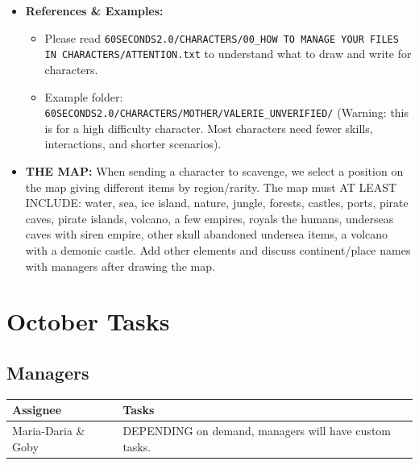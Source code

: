 \documentclass[11pt,a4paper]{article}
\begin{document}
\begin{itemize}[leftmargin=*, nosep]
\begin{enumerate}
        \item \textbf{Scenario Path} (Only required if the character is not unlocked at the start of the game):
        \begin{itemize}
            \item Talk to the manager for more information.
            \item Keep scenario paths concise unless the character has extensive lore. Maximum 7 steps: Easy ($\sim$3 steps), Medium ($\sim$5 steps), Hard ($\sim$7 steps).
            \item \textit{Scenario Flow Format:} SCENARIO START: Story 1 (no item required) $\rightarrow$ Story 2 (Requires YES/NO or specific item) $\rightarrow$ Story 3 \dots $\rightarrow$ Story 7 (Unlock the character).
        \end{itemize}
    \end{enumerate}
    \vspace{0.2cm}
    \item \textbf{References \& Examples:}
    \begin{itemize}
        \item Please read \texttt{60SECONDS2.0/CHARACTERS/00\_HOW TO MANAGE YOUR FILES IN CHARACTERS/ATTENTION.txt} to understand what to draw and write for characters.
        \item Example folder: \texttt{60SECONDS2.0/CHARACTERS/MOTHER/VALERIE\_UNVERIFIED/} (Warning: this is for a high difficulty character. Most characters need fewer skills, interactions, and shorter scenarios).
    \end{itemize}
    \vspace{0.2cm}
    \item \textbf{THE MAP:} When sending a character to scavenge, we select a position on the map giving different items by region/rarity. The map must AT LEAST INCLUDE: water, sea, ice island, nature, jungle, forests, castles, ports, pirate caves, pirate islands, volcano, a few empires, royals the humans, underseas caves with siren empire, other skull abandoned undersea items, a volcano with a demonic castle. Add other elements and discuss continent/place names with managers after drawing the map.
\end{itemize}


\newpage
\section*{October Tasks}

\subsection*{Managers}
\begin{tabularx}{\textwidth}{@{} l X @{}}
\toprule
\textbf{Assignee} & \textbf{Tasks} \\
\midrule
Maria-Daria \& Goby & DEPENDING on demand, managers will have custom tasks. \\
\bottomrule
\end{tabularx}
\end{document}
